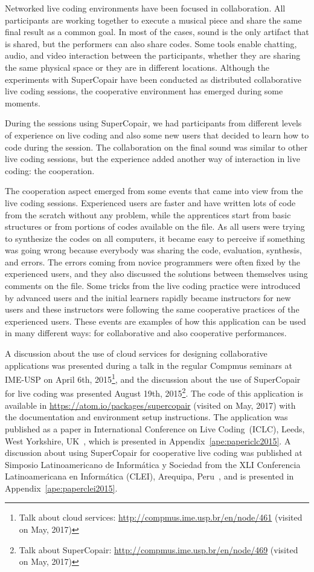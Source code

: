 Networked live coding environments have been focused in collaboration.
All participants are working together to execute a musical piece and share the same final result as a common goal.
In most of the cases, sound is the only artifact that is shared, but the performers can also share codes.
Some tools enable chatting, audio, and video interaction between the participants, whether they are sharing the same physical space or they are in different locations.
Although the experiments with SuperCopair have been conducted as distributed collaborative live coding sessions, the cooperative environment has emerged during some moments.

During the sessions using SuperCopair, we had participants from different levels of experience on live coding and also some new users that decided to learn how to code during the session.
The collaboration on the final sound was similar to other live coding sessions, but the experience added another way of interaction in live coding: the cooperation. 

The cooperation aspect emerged from some events that came into view from the live coding sessions.
Experienced users are faster and have written lots of code from the scratch without any problem, while the apprentices start from basic structures or from portions of codes available on the file.
As all users were trying to synthesize the codes on all computers, it became easy to perceive if something was going wrong because everybody was sharing the code, evaluation, synthesis, and errors.
The errors coming from novice programmers were often fixed by the experienced users, and they also discussed the solutions between themselves using comments on the file.
Some tricks from the live coding practice were introduced by advanced users and the initial learners rapidly became instructors for new users and these instructors were following the same cooperative practices of the experienced users.
These events are examples of how this application can be used in many different ways: for collaborative and also cooperative performances.

A discussion about the use of cloud services for designing collaborative applications was presented during a talk in the regular Compmus seminars at IME-USP on April 6th, 2015\footnote{Talk about cloud services: \url{http://compmus.ime.usp.br/en/node/461} (visited on May, 2017)}, and the discussion about the use of SuperCopair for live coding was presented August 19th, 2015\footnote{Talk about SuperCopair: \url{http://compmus.ime.usp.br/en/node/469} (visited on May, 2017)}.
The code of this application is available in \url{https://atom.io/packages/supercopair} (visited on May, 2017) with the documentation and environment setup instructions.
The application was published as a paper in International Conference on Live Coding~(ICLC), Leeds, West Yorkshire, UK~\citep{deCarvalhoJunior2015supercopair}, which is presented in Appendix~\ref{ape:papericlc2015}.
A discussion about using SuperCopair for cooperative live coding was published at Simposio Latinoamericano de Informática y Sociedad from the XLI Conferencia Latinoamericana en Informática (CLEI), Arequipa, Peru~\citep{deCarvalhoJunior2015cooperative}, and is presented in Appendix~\ref{ape:paperclei2015}.

